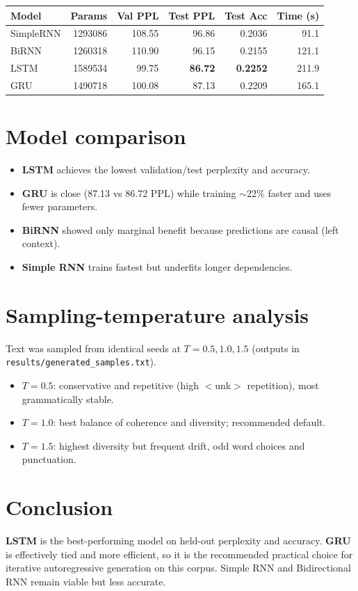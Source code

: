 \documentclass[11pt]{article}
\begin{document}
\begin{center}
\begin{tabular}{lrrrrr}
\toprule
Model & Params & Val PPL & Test PPL & Test Acc & Time (s) \\
\midrule
SimpleRNN & 1293086 & 108.55 & 96.86 & 0.2036 & 91.1 \\
BiRNN     & 1260318 & 110.90 & 96.15 & 0.2155 & 121.1 \\
LSTM      & 1589534 & 99.75  & \textbf{86.72} & \textbf{0.2252} & 211.9 \\
GRU       & 1490718 & 100.08 & 87.13 & 0.2209 & 165.1 \\
\bottomrule
\end{tabular}
\end{center}

\section{Model comparison}
\begin{itemize}
\item \textbf{LSTM} achieves the lowest validation/test perplexity and accuracy.
\item \textbf{GRU} is close (87.13 vs 86.72 PPL) while training $\sim$22\% faster and uses fewer parameters.
\item \textbf{BiRNN} showed only marginal benefit because predictions are causal (left context).
\item \textbf{Simple RNN} trains fastest but underfits longer dependencies.
\end{itemize}

\section{Sampling-temperature analysis}
Text was sampled from identical seeds at $T=0.5,1.0,1.5$ (outputs in
\texttt{results/generated\_samples.txt}).
\begin{itemize}
\item $T=0.5$: conservative and repetitive (high $<$unk$>$ repetition), most grammatically stable.
\item $T=1.0$: best balance of coherence and diversity; recommended default.
\item $T=1.5$: highest diversity but frequent drift, odd word choices and punctuation.
\end{itemize}

\section{Conclusion}
\textbf{LSTM} is the best-performing model on held-out perplexity and accuracy. \textbf{GRU}
is effectively tied and more efficient, so it is the recommended practical choice for
iterative autoregressive generation on this corpus. Simple RNN and Bidirectional RNN remain
viable but less accurate.
\end{document}
